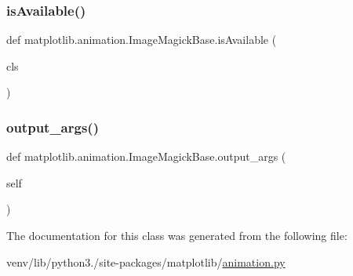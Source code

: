 \subsubsection{\texorpdfstring{is\+Available()}{isAvailable()}}
{\footnotesize\ttfamily def matplotlib.\+animation.\+Image\+Magick\+Base.\+is\+Available (\begin{DoxyParamCaption}\item[{}]{cls }\end{DoxyParamCaption})}

\mbox{\label{classmatplotlib_1_1animation_1_1ImageMagickBase_a5ff627bf27c719ac025e642b7f3947a0}} 
\subsubsection{\texorpdfstring{output\+\_\+args()}{output\_args()}}
{\footnotesize\ttfamily def matplotlib.\+animation.\+Image\+Magick\+Base.\+output\+\_\+args (\begin{DoxyParamCaption}\item[{}]{self }\end{DoxyParamCaption})}



The documentation for this class was generated from the following file\+:\begin{DoxyCompactItemize}
\item 
venv/lib/python3./site-\/packages/matplotlib/\hyperlink{animation_8py}{animation.\+py}\end{DoxyCompactItemize}
